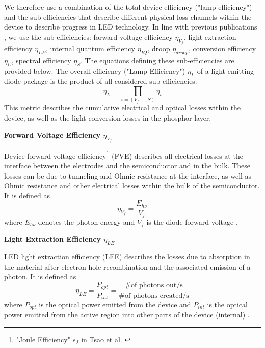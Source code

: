 \documentclass[parskip=full]{article}
\begin{document}
We therefore use a combination of the total device efficiency ("lamp efficiency") and the sub-efficiencies that describe different physical loss channels within the device to describe progress in LED technology. In line with previous publications \cite{schubert2018light,tsao2010solid}, we use the sub-efficiencies: forward voltage efficiency $\eta_{V_f}$, light extraction efficiency $\eta_{LE}$, internal quantum efficiency $\eta_{IQ}$, droop $\eta_{droop}$, conversion efficiency $\eta_{C}$, spectral efficiency $\eta_{S}$. The equations defining these sub-efficiencies are provided below. The overall efficiency ("Lamp Efficiency") $\eta_L$ of a light-emitting diode package is the product of all considered sub-efficiencies:
%
\begin{equation}
    \eta_L = \prod_{i=(V_f, \dots, S)} \eta_i
\end{equation}
%
This metric describes the cumulative electrical and optical losses within the device, as well as the light conversion losses in the phosphor layer.

\textbf{Forward Voltage Efficiency $\eta_{V_f}$}

Device forward voltage efficiency\footnote{"Joule Efficiency" $\epsilon_J$ in Tsao et al. \cite{tsao2010solid}} (FVE) describes all electrical losses at the interface between the electrodes and the semiconductor and in the bulk. These losses can be due to tunneling and Ohmic resistance at the interface, as well as Ohmic resistance and other electrical losses within the bulk of the semiconductor. It is defined as
%
\begin{equation}
    \eta_{V_f} = \frac{E_{h\nu}}{V_f}
\end{equation}
%
where $E_{h\nu}$ denotes the photon energy and $V_f$ is the diode forward voltage \cite{schubert2018light}\cite{tsao2010solid}.

\textbf{Light Extraction Efficiency $\eta_{LE}$}

LED light extraction efficiency (LEE) describes the  losses due to absorption in the material after electron-hole recombination and the associated emission of a photon. It is defined as
%
\begin{equation}
    \eta_{LE} = \frac{P_{opt}}{P_{int}} = \frac{\text{\# of photons out/s}}{\text{\# of photons created/s}}
\end{equation}
%
where $P_{opt}$ is the optical power emitted from the device and  $P_{int}$ is the optical power emitted from the active region into other parts of the device (internal) \cite{schubert2018light}\cite{tsao2010solid}.
\end{document}
